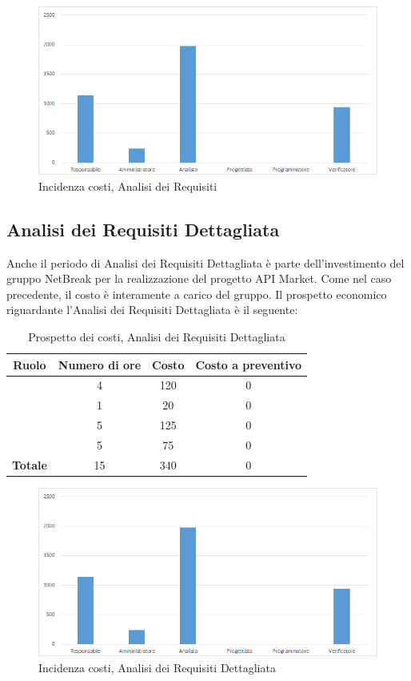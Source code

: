 \begin{figure}[H]
	\centering
	\includegraphics[scale=0.6]{img/8-1.png}
	\caption{Incidenza costi, Analisi dei Requisiti}
\end{figure}

\subsection{Analisi dei Requisiti Dettagliata}
Anche il periodo di Analisi dei Requisiti Dettagliata è parte dell'investimento del gruppo NetBreak per la realizzazione del progetto API Market. Come nel caso precedente, il costo è interamente a carico del gruppo. Il prospetto economico riguardante l'Analisi dei Requisiti Dettagliata è il seguente:


\begin{table}[H]
	\begin{center}
		\begin{tabular}{|c|c|c|c|}
			\hline
			\textbf{Ruolo}	& \textbf{Numero di ore} & \textbf{Costo} & \textbf{Costo a preventivo}\\
			\hline
			\Res	&	4  &	120 &  0	\\
			\hline
			\Amm	&	1  &	20 &  0	\\
			\hline
			\Ana	&	5  &	125 &  0	\\
			\hline
			\Ver	&	5  &	75	&  0	\\
			\hline
			\textbf{Totale}  &	15	&  340	 &  0	\\
			\hline
		\end{tabular}
	\end{center}
	\caption{Prospetto dei costi, Analisi dei Requisiti Dettagliata }
\end{table}

\begin{figure}[H]
	\centering
	\includegraphics[scale=0.6]{img/8-1.png}
	\caption{Incidenza costi, Analisi dei Requisiti Dettagliata}
\end{figure}

